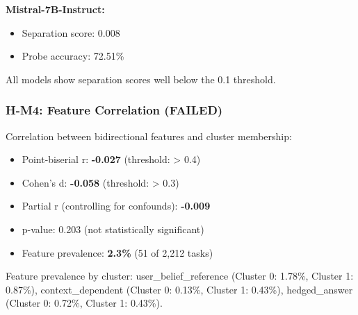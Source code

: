 \textbf{Mistral-7B-Instruct:}
\begin{itemize}
\item Separation score: 0.008
\item Probe accuracy: 72.51\%
\end{itemize}

All models show separation scores well below the 0.1 threshold.

\subsubsection{H-M4: Feature Correlation (FAILED)}

Correlation between bidirectional features and cluster membership:

\begin{itemize}
\item Point-biserial r: \textbf{-0.027} (threshold: > 0.4)
\item Cohen's d: \textbf{-0.058} (threshold: > 0.3)
\item Partial r (controlling for confounds): \textbf{-0.009}
\item p-value: 0.203 (not statistically significant)
\item Feature prevalence: \textbf{2.3\%} (51 of 2,212 tasks)
\end{itemize}

Feature prevalence by cluster: user\_belief\_reference (Cluster 0: 1.78\%, Cluster 1: 0.87\%), context\_dependent (Cluster 0: 0.13\%, Cluster 1: 0.43\%), hedged\_answer (Cluster 0: 0.72\%, Cluster 1: 0.43\%).
